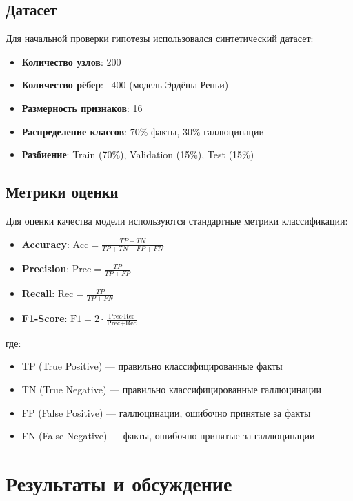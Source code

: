 \documentclass[12pt,a4paper]{article}
\begin{document}
\subsection{Датасет}
Для начальной проверки гипотезы использовался синтетический датасет:

\begin{itemize}
    \item \textbf{Количество узлов}: 200
    \item \textbf{Количество рёбер}: ~400 (модель Эрдёша-Реньи)
    \item \textbf{Размерность признаков}: 16
    \item \textbf{Распределение классов}: 70\% факты, 30\% галлюцинации
    \item \textbf{Разбиение}: Train (70\%), Validation (15\%), Test (15\%)
\end{itemize}

\subsection{Метрики оценки}
Для оценки качества модели используются стандартные метрики классификации:

\begin{itemize}
    \item \textbf{Accuracy}: $\text{Acc} = \frac{TP + TN}{TP + TN + FP + FN}$
    \item \textbf{Precision}: $\text{Prec} = \frac{TP}{TP + FP}$
    \item \textbf{Recall}: $\text{Rec} = \frac{TP}{TP + FN}$
    \item \textbf{F1-Score}: $\text{F1} = 2 \cdot \frac{\text{Prec} \cdot \text{Rec}}{\text{Prec} + \text{Rec}}$
\end{itemize}

где:
\begin{itemize}
    \item TP (True Positive) — правильно классифицированные факты
    \item TN (True Negative) — правильно классифицированные галлюцинации
    \item FP (False Positive) — галлюцинации, ошибочно принятые за факты
    \item FN (False Negative) — факты, ошибочно принятые за галлюцинации
\end{itemize}

\section{Результаты и обсуждение}
\end{document}
